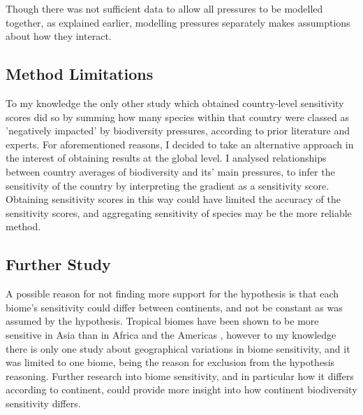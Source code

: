 \documentclass[11pt, a4paper, titlepage]{article}
\begin{document}
	Though there was not sufficient data to allow all pressures to be modelled together, as explained earlier, modelling pressures separately makes assumptions about how they interact. 
	
	\subsection*{Method Limitations}
     
     To my knowledge the only other study which obtained country-level sensitivity scores  \citep{louette2010bioscore} did so by summing how many species within that country were classed as 'negatively impacted' by biodiversity pressures, according to prior literature and experts. For aforementioned reasons, I decided to take an alternative approach in the interest of obtaining results at the global level. I analysed relationships between country averages of biodiversity and its' main pressures, to infer the sensitivity of the country by interpreting the gradient as a sensitivity score. Obtaining sensitivity scores in this way could have limited the accuracy of the sensitivity scores, and aggregating sensitivity of species may be the more reliable method.
     
     \subsection*{Further Study}
     
     A possible reason for not finding more support for the hypothesis is that each biome's sensitivity could differ between continents, and not be constant as was assumed by the hypothesis. Tropical biomes have been shown to be more sensitive in Asia than in Africa and the Americas \citep{gibson2011primary}, however to my knowledge there is only one study about geographical variations in biome sensitivity, and it was limited to one biome, being the reason for exclusion from the hypothesis reasoning. Further research into biome sensitivity, and in particular how it differs according to continent, could provide more insight into how continent biodiversity sensitivity differs. 
    
         
\end{document}
